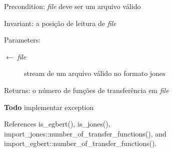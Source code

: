 \begin{Desc}
\item[Precondition:]{\em file\/} deve ser um arquivo válido \end{Desc}
\begin{Desc}
\item[Invariant:]a posição de leitura de {\em file\/} \end{Desc}
\begin{Desc}
\item[Parameters:]
\begin{description}
\item[\mbox{$\leftarrow$} {\em file}]stream de um arquivo válido no formato jones\end{description}
\end{Desc}
\begin{Desc}
\item[Returns:]o número de funções de transferência em {\em file\/} \end{Desc}
\begin{Desc}
\item[{\bf Todo}]implementar exception \end{Desc}


References is\_\-egbert(), is\_\-jones(), import\_\-jones::number\_\-of\_\-transfer\_\-functions(), and import\_\-egbert::number\_\-of\_\-transfer\_\-functions().